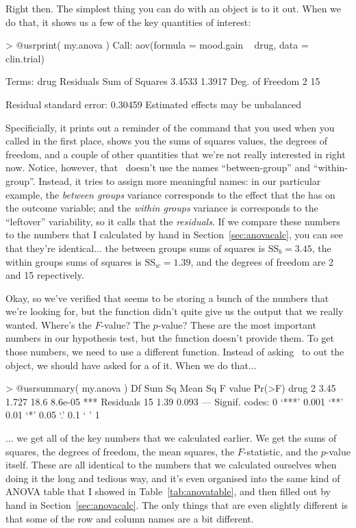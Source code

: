 Right then. The simplest thing you can do with an  object is to  it out. When we do that, it shows us a few of the key quantities of interest:
\begin{rblock1}
> @usr{print( my.anova )}
Call:
   aov(formula = mood.gain ~ drug, data = clin.trial)

Terms:
                  drug Residuals
Sum of Squares  3.4533    1.3917
Deg. of Freedom      2        15

Residual standard error: 0.30459 
Estimated effects may be unbalanced
\end{rblock1}
Specificially, it prints out a reminder of the command that you used when you called  in the first place, shows you the sums of squares values, the degrees of freedom, and a couple of other quantities that we're not really interested in right now. Notice, however, that \R\ doesn't use the names ``between-group'' and ``within-group''. Instead, it tries to assign more meaningful names: in our particular example, the {\it between groups} variance corresponds to the effect that the  has on the outcome variable; and the {\it within groups} variance is corresponds to the ``leftover'' variability, so it calls that the {\it residuals}. If we compare these numbers to the numbers that I calculated by hand in Section~\ref{sec:anovacalc}, you can see that they're identical... the between groups sums of squares is $\mbox{SS}_b = 3.45$, the within groups sums of squares is $\mbox{SS}_w = 1.39$, and the degrees of freedom are 2 and 15 repectively. 


Okay, so we've verified that  seems to be storing a bunch of the numbers that we're looking for, but the  function didn't quite give us the output that we really wanted. Where's the $F$-value? The $p$-value? These are the most important numbers in our hypothesis test, but the  function doesn't provide them. To get those numbers, we need to use a different function. Instead of asking \R\ to  out the  object, we should have asked for a  of it. When we do that...
\begin{rblock1}
> @usr{summary( my.anova )}
            Df Sum Sq Mean Sq F value  Pr(>F)    
drug         2   3.45   1.727    18.6 8.6e-05 ***
Residuals   15   1.39   0.093                       
---
Signif. codes:  0 ‘***’ 0.001 ‘**’ 0.01 ‘*’ 0.05 ‘.’ 0.1 ‘ ’ 1 
\end{rblock1}
... we get all of the key numbers that we calculated earlier. We get the sums of squares, the degrees of freedom, the mean squares, the $F$-statistic, and the $p$-value itself. These are all identical to the numbers that we calculated ourselves when doing it the long and tedious way, and it's even organised into the same kind of ANOVA table that I showed in Table~\ref{tab:anovatable}, and then filled out by hand in Section~\ref{sec:anovacalc}. The only things that are even slightly different is that some of the row and column names are a bit different.


